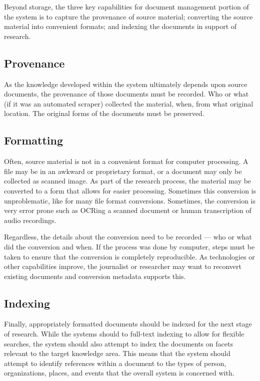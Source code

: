 \documentclass[format=siggraph, review=true]{acmart}
\begin{document}
Beyond storage, the three key capabilities for document management
portion of the system is to capture the provenance of source material;
converting the source material into convenient formats; and indexing
the documents in support of research.

\subsection{Provenance}
As the knowledge developed within the system ultimately depends upon
source documents, the provenance of those documents must be
recorded. Who or what (if it was an automated scraper) collected the
material, when, from what original location. The original forms of the
documents must be preserved.

\subsection{Formatting}
Often, source material is not in a convenient format for computer
processing. A file may be in an awkward or proprietary format, or a
document may only be collected as scanned image. As part of the
research process, the material may be converted to a form that allows
for easier processing. Sometimes this conversion is unproblematic,
like for many file format conversions. Sometimes, the conversion is
very error prone such as OCRing a scanned document or human
transcription of audio recordings.

Regardless, the details about the conversion need to be recorded ---
who or what did the conversion and when. If the process was done by
computer, steps must be taken to ensure that the conversion is
completely reproducible. As technologies or other capabilities
improve, the journalist or researcher may want to reconvert existing
documents and conversion metadata supports this.

\subsection{Indexing}
Finally, appropriately formatted documents should be indexed for the
next stage of research. While the systems should to full-text indexing
to allow for flexible searches, the system should also attempt to
index the documents on facets relevant to the target knowledge
area. This means that the system should attempt to identify references
within a document to the types of person, organizations, places, and
events that the overall system is concerned with.
\end{document}

